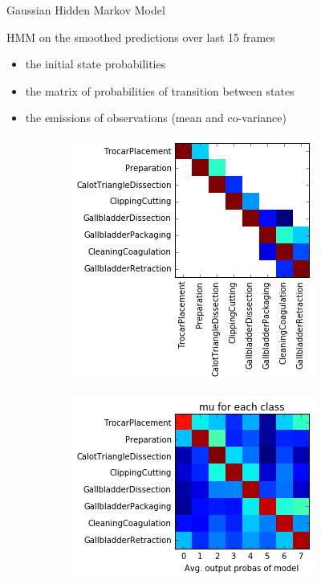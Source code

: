 \begin{frame}{Gaussian Hidden Markov Model}
	
	\begin{block}{HMM on the smoothed predictions over last 15 frames}
	\begin{itemize}
		\item the initial state probabilities
		\item the matrix of probabilities of transition between states 
		\item the emissions of observations (mean and co-variance)
	\end{itemize}
	\end{block}	
	
	\begin{figure}
		\centering
		\begin{subfigure}{.49\textwidth}
			\centering
			\includegraphics[width=.75\linewidth]{images/index.png}
			\label{fig:dsg1}
		\end{subfigure}%
		\begin{subfigure}{.49\textwidth}
			\centering
			\includegraphics[width=.75\linewidth]{images/index2.png}
			\label{fig:dsg2}
		\end{subfigure}
		\label{fig:dsgimages}
	\end{figure}	
	
\end{frame}

